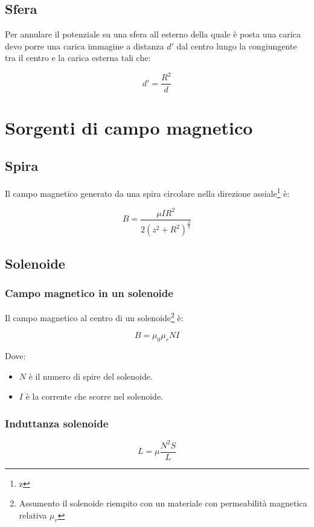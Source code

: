 \documentclass[10pt,a4paper]{report}
\begin{document}
\section{Sfera}

Per annulare il potenziale su una sfera all esterno della quale è posta una carica devo porre una carica immagine a distanza $d'$ dal centro lungo la congiungente tra il centro e la carica esterna tali che:

\[
d'=\frac{R^2}{d}
\]


\chapter{Sorgenti di campo magnetico}

	\section{Spira}
			Il campo magnetico generato da una spira circolare nella direzione assiale\footnote{z} è:

			\begin{equation}
			B=\frac{\mu IR^2}{2(z^2+R^2)^{\frac{3}{2}}}
			\end{equation}

	\section{Solenoide}
		\subsection{Campo magnetico in un solenoide}
			Il campo magnetico al centro di un solenoide\footnote{Assumento il solenoide riempito con un materiale con permeabilità magnetica relativa $\mu_r$} è:

			\begin{equation}
			B=\mu_0\mu_rNI
			\end{equation}

			Dove:

			\begin{itemize}
			\item $N$ è il numero di spire del solenoide.
			\item $I$ è la corrente che scorre nel solenoide.
			\end{itemize}

		\subsection{Induttanza solenoide}
				\begin{equation} 
				L=\mu \frac{N^2S}{L}
				\label{eq:induttanza-solenoide}
				\end{equation}
\end{document}
